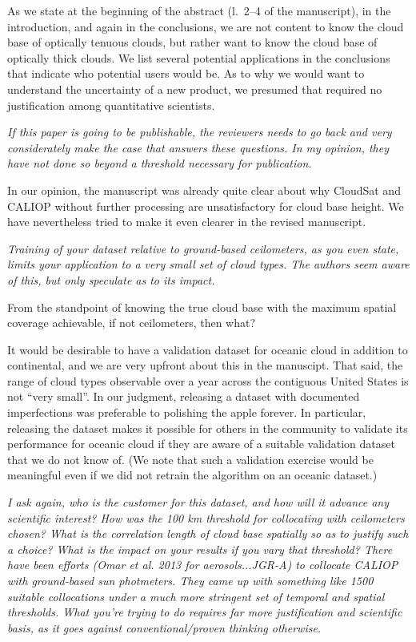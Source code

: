 \documentclass[12pt,a4paper]{responses}
\begin{document}
As we state at the beginning of the abstract (l.~2--4 of the manuscript), in the
introduction, and again in the conclusions, we are not content to know the cloud
base of optically tenuous clouds, but rather want to know the cloud base of
optically thick clouds.  We list several potential applications in the
conclusions that indicate who potential users would be.  As to why we would want
to understand the uncertainty of a new product, we presumed that required no
justification among quantitative scientists. 

\textit{If this paper is going to be publishable, the reviewers needs
to go back and very considerately make the case that answers these questions. In my
opinion, they have not done so beyond a threshold necessary for publication.}

In our opinion, the manuscript was already quite clear about why CloudSat and
CALIOP without further processing are unsatisfactory for cloud base height.  We
have nevertheless tried to make it even clearer in the revised manuscript.

\textit{Training of your dataset relative to ground-based ceilometers, as you
  even state, limits your application to a very small set of cloud types. The
  authors seem aware of this, but only speculate as to its impact.}

From the standpoint of knowing the true cloud base with the maximum spatial
coverage achievable, if not ceilometers, then what?  

It would be desirable to have a validation dataset for oceanic cloud in addition
to continental, and we are very upfront about this in the manuscipt.  That said,
the range of cloud types observable over a year across the contiguous United
States is not ``very small''.  In our judgment, releasing a dataset with
documented imperfections was preferable to polishing the apple forever.  In
particular, releasing the dataset makes it possible for others in the community
to validate its performance for oceanic cloud if they are aware of a suitable
validation dataset that we do not know of.  (We note that such a validation
exercise would be meaningful even if we did not retrain the algorithm on an
oceanic dataset.)

\textit{I ask again, who is the customer for this dataset, and how will it
  advance any scientific interest? How was the 100 km threshold for collocating
with ceilometers chosen?  What is the correlation length of cloud base spatially so as
to justify such a choice? What is the impact on your results if you vary that threshold?
There have been efforts (Omar et al. 2013 for aerosols...JGR-A) to collocate CALIOP
with ground-based sun photmeters.  They came up with something like 1500 suitable
collocations under a much more stringent set of temporal and spatial thresholds. What
you’re trying to do requires far more justification and scientific basis, as it goes against
conventional/proven thinking otherwise.}
\end{document}
